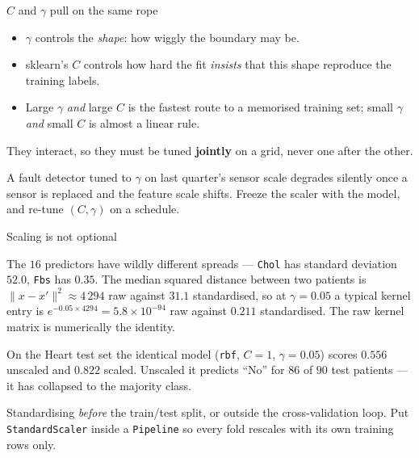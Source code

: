 \documentclass[aspectratio=169,11pt]{beamer}
\begin{document}
\begin{frame}{$C$ and $\gamma$ pull on the same rope}
  \begin{readme}
    \begin{itemize}
      \item $\gamma$ controls the \emph{shape}: how wiggly the boundary may be.
      \item sklearn's $C$ controls how hard the fit \emph{insists} that this
            shape reproduce the training labels.
      \item Large $\gamma$ \emph{and} large $C$ is the fastest route to a
            memorised training set; small $\gamma$ \emph{and} small $C$ is
            almost a linear rule.
    \end{itemize}
  \end{readme}
  \begin{takeaway}
    They interact, so they must be tuned \textbf{jointly} on a grid, never one
    after the other.
  \end{takeaway}
  \begin{industry}
    A fault detector tuned to $\gamma$ on last quarter's sensor scale degrades
    silently once a sensor is replaced and the feature scale shifts. Freeze the
    scaler with the model, and re-tune $(C,\gamma)$ on a schedule.
  \end{industry}
\end{frame}

\begin{frame}{Scaling is not optional}
  \footnotesize
  \begin{numexample}
    The $16$ predictors have wildly different spreads --- \texttt{Chol} has
    standard deviation $52.0$, \texttt{Fbs} has $0.35$. The median squared
    distance between two patients is $\|x-x'\|^2 \approx 4\,294$ raw against
    $31.1$ standardised, so at $\gamma=0.05$ a typical kernel entry is
    $e^{-0.05\times 4294} = 5.8\times10^{-94}$ raw against $0.211$
    standardised. The raw kernel matrix is numerically the identity.
  \end{numexample}
  \begin{takeaway}
    On the Heart test set the identical model (\texttt{rbf}, $C=1$,
    $\gamma=0.05$) scores $0.556$ unscaled and $\mathbf{0.822}$ scaled.
    Unscaled it predicts ``No'' for $86$ of $90$ test patients --- it has
    collapsed to the majority class.
  \end{takeaway}
  \begin{mistake}
    Standardising \emph{before} the train/test split, or outside the
    cross-validation loop. Put \texttt{StandardScaler} inside a
    \texttt{Pipeline} so every fold rescales with its own training rows only.
  \end{mistake}
\end{frame}
\end{document}
